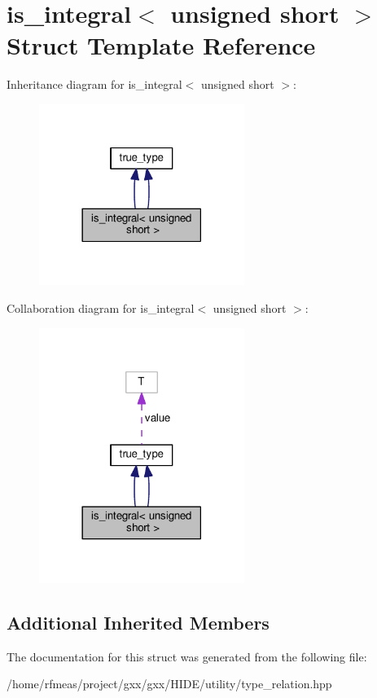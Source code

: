 \hypertarget{structis__integral_3_01unsigned_01short_01_4}{}\section{is\+\_\+integral$<$ unsigned short $>$ Struct Template Reference}
\label{structis__integral_3_01unsigned_01short_01_4}


Inheritance diagram for is\+\_\+integral$<$ unsigned short $>$\+:
\nopagebreak
\begin{figure}[H]
\begin{center}
\leavevmode
\includegraphics[width=189pt]{structis__integral_3_01unsigned_01short_01_4__inherit__graph}
\end{center}
\end{figure}


Collaboration diagram for is\+\_\+integral$<$ unsigned short $>$\+:
\nopagebreak
\begin{figure}[H]
\begin{center}
\leavevmode
\includegraphics[width=189pt]{structis__integral_3_01unsigned_01short_01_4__coll__graph}
\end{center}
\end{figure}
\subsection*{Additional Inherited Members}


The documentation for this struct was generated from the following file\+:\begin{DoxyCompactItemize}
\item 
/home/rfmeas/project/gxx/gxx/\+H\+I\+D\+E/utility/type\+\_\+relation.\+hpp\end{DoxyCompactItemize}
